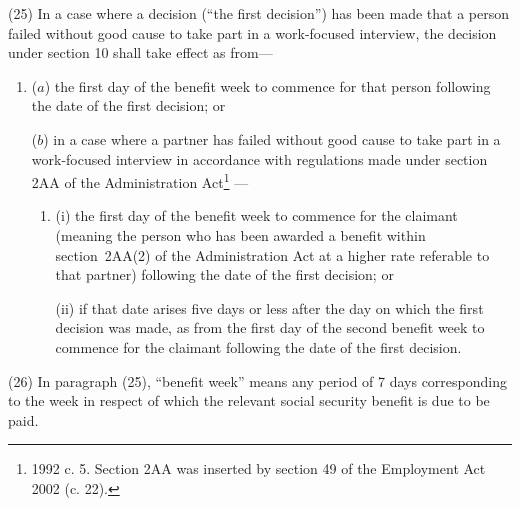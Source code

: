 \documentclass[12pt,a4paper]{article}
\begin{document}
(25) In a case where a decision (“the first decision”) has been made that a person failed without good cause to take part in a work-focused interview, the decision under section 10 shall take effect as from—
\begin{enumerate}\item[]
($a$) the first day of the benefit week to commence for that person following the date of the first decision; or

($b$) in a case where a partner has failed without good cause to take part in a work-focused interview 
in accordance with regulations made under section 2AA of the Administration Act\footnote{1992 c. 5. Section 2AA was inserted by section 49 of the Employment Act 2002 (c. 22).}%
—
\begin{enumerate}\item[]
(i) the first day of the benefit week to commence for the claimant 
(meaning the person who has been awarded a benefit within section~2AA(2) of the Administration Act at a higher rate referable to that partner)  %
following the date of the first decision; or

(ii) if that date arises five days or less after the day on which the first decision was made, as from the first day of the second benefit week to commence for the claimant following the date of the first decision.
\end{enumerate}
\end{enumerate}

(26) In paragraph (25), “benefit week” means any period of 7 days corresponding to the week in respect of which the relevant social security benefit is due to be paid.
\end{document}
